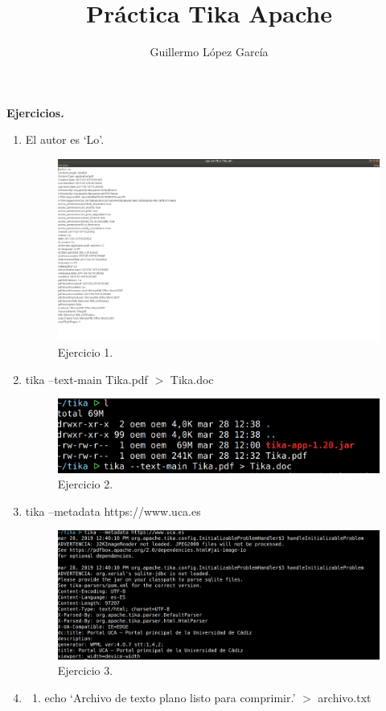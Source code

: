 \documentclass{article}
\title{Práctica Tika Apache}
\author{Guillermo López García}
\begin{document}
\maketitle

\textbf{Ejercicios.}
\begin{enumerate}
    \item El autor es `Lo'.
        \begin{figure}[H]
        \centering
        \includegraphics[width=0.7\linewidth]{./ej1}
        \caption{Ejercicio 1.}
        \end{figure}
    \item tika --text-main Tika.pdf $>$ Tika.doc
        \begin{figure}[H]
        \centering
        \includegraphics[width=0.7\linewidth]{./ej2}
        \caption{Ejercicio 2.}
        \end{figure}
    \item tika --metadata https://www.uca.es
        \begin{figure}[H]
        \centering
        \includegraphics[width=0.7\linewidth]{./ej3}
        \caption{Ejercicio 3.}
        \end{figure}
    \item
        \begin{enumerate}
            \item echo `Archivo de texto plano listo para comprimir.' $>$ archivo.txt

\end{enumerate}
\end{enumerate}
\end{document}
